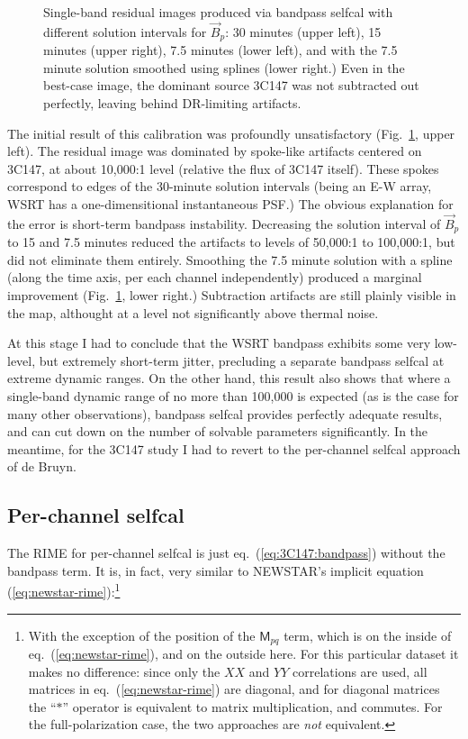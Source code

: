 \documentclass[]{aa}
\newcommand{\jones}[2]{\vec {#1}_{#2}}
\newcommand{\coh}[2]{\mathsf{{#1}}_{{#2}}}
\begin{document}
\begin{figure}
\begin{centering}
\end{centering}
\caption{\label{fig:Bsol}Single-band residual images produced via bandpass selfcal with different solution intervals for $\jones{B}{p}$: 30 minutes (upper left), 15 minutes (upper right), 7.5 minutes (lower left), and with the 7.5 minute solution smoothed using splines (lower right.) Even in the best-case image, the dominant source 3C147 was not subtracted out perfectly, leaving behind DR-limiting artifacts.}
\end{figure}

The initial result of this calibration was profoundly unsatisfactory (Fig.~\ref{fig:Bsol}, upper left). The residual image was dominated by spoke-like artifacts centered on 3C147, at about 10,000:1 level (relative the flux of 3C147 itself). These spokes correspond to edges of the 30-minute solution intervals (being an E-W array, WSRT has a one-dimensitional instantaneous PSF.) The obvious explanation for the error is short-term bandpass instability. Decreasing the solution interval of $\jones{B}{p}$ to 15 and 7.5 minutes reduced the artifacts to levels of 50,000:1 to 100,000:1, but did not eliminate them entirely. Smoothing the 7.5 minute solution with a spline (along the time axis, per each channel independently) produced a marginal improvement (Fig.~\ref{fig:Bsol}, lower right.) Subtraction artifacts are still plainly visible in the map, althought at a level not significantly above thermal noise.

At this stage I had to conclude that the WSRT bandpass exhibits some very low-level, but extremely short-term jitter, precluding a separate bandpass selfcal at extreme dynamic ranges. On the other hand, this result also shows that where a single-band dynamic range of no more than 100,000 is expected (as is the case for many other observations), bandpass selfcal provides perfectly adequate results, and can cut down on the number of solvable parameters significantly. In the meantime, for the 3C147 study I had to revert to the per-channel selfcal approach of de Bruyn.

\subsection{Per-channel selfcal}

The RIME for per-channel selfcal is just eq.~(\ref{eq:3C147:bandpass}) without the bandpass term. It is, in fact, very similar to NEWSTAR's implicit equation (\ref{eq:newstar-rime}):\footnote{With the exception of the position of the $\coh{M}{pq}$ term, which is on the inside of eq.~(\ref{eq:newstar-rime}), and on the outside here. For this particular dataset it makes no difference: since only the $XX$ and $YY$ correlations are used, all matrices in eq.~(\ref{eq:newstar-rime}) are diagonal, and for diagonal matrices the ``$\ast$'' operator is equivalent to matrix multiplication, and commutes. For the full-polarization case, the two approaches are \emph{not} equivalent.}
 
\end{document}
